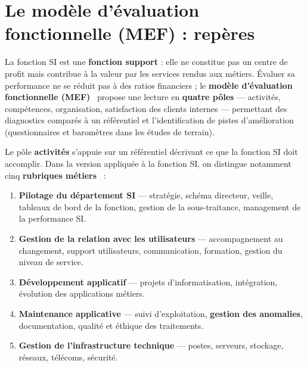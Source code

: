 \section{Le modèle d'évaluation fonctionnelle (MEF) : repères}
La fonction SI est une \textbf{fonction support} : elle ne constitue pas un centre de profit mais
contribue à la valeur par les services rendus aux métiers. Évaluer sa performance ne se réduit pas
à des ratios financiers ; le \textbf{modèle d'évaluation fonctionnelle (MEF)}~\cite{autissier2008}
propose une lecture en \textbf{quatre pôles} — activités, compétences, organisation, satisfaction
des clients internes — permettant des diagnostics comparés à un référentiel et l'identification de
pistes d'amélioration (questionnaires et baromètres dans les études de terrain).

Le pôle \textbf{activités} s'appuie sur un référentiel décrivant ce que la fonction SI doit
accomplir. Dans la version appliquée à la fonction SI, on distingue notamment cinq
\textbf{rubriques métiers}~\cite{autissier2008,meghari2014} :
\begin{enumerate}
    \item \textbf{Pilotage du département SI} — stratégie, schéma directeur, veille, tableaux de
    bord de la fonction, gestion de la sous-traitance, management de la performance SI.
    \item \textbf{Gestion de la relation avec les utilisateurs} — accompagnement au changement,
    support utilisateurs, communication, formation, gestion du niveau de service.
    \item \textbf{Développement applicatif} — projets d'informatisation, intégration, évolution
    des applications métiers.
    \item \textbf{Maintenance applicative} — suivi d'exploitation, \textbf{gestion des anomalies},
    documentation, qualité et éthique des traitements.
    \item \textbf{Gestion de l'infrastructure technique} — postes, serveurs, stockage, réseaux,
    télécoms, sécurité.
\end{enumerate}

